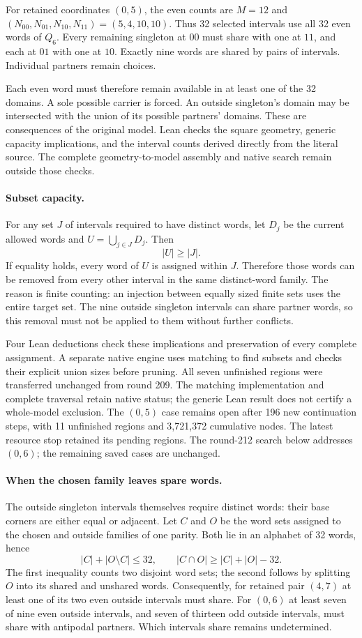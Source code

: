 \documentclass[11pt,a4paper]{article}
\begin{document}
For retained coordinates $(0,5)$, the even counts are
$M=12$ and $(N_{00},N_{01},N_{10},N_{11})=(5,4,10,10)$.
Thus 32 selected intervals use all 32 even words of $Q_6$.
Every remaining singleton at $00$ must share with one at $11$,
and each at $01$ with one at $10$. Exactly nine words are shared by
pairs of intervals. Individual partners remain choices.

Each even word must therefore remain available in at least one of
the 32 domains. A sole possible carrier is forced. An outside
singleton's domain may be intersected with the union of its possible
partners' domains. These are consequences of the original model.
Lean checks the square geometry, generic capacity implications, and
the interval counts derived directly from the literal source.
The complete geometry-to-model assembly and native search remain
outside those checks.

\paragraph{Subset capacity.}
For any set $J$ of intervals required to have distinct words, let $D_j$
be the current allowed words and $U=\bigcup_{j\in J}D_j$. Then
\[
|U|\ge |J|.
\]
If equality holds, every word of $U$ is assigned within $J$. Therefore
those words can be removed from every other interval in the same
distinct-word family. The reason is finite counting: an injection
between equally sized finite sets uses the entire target set.
The nine outside singleton intervals can share partner words, so
this removal must not be applied to them without further conflicts.

Four Lean deductions check these implications and preservation of
every complete assignment. A separate native engine uses matching
to find subsets and checks their explicit union sizes before pruning.
All seven unfinished regions were transferred unchanged from round 209.
The matching implementation and complete traversal retain native status;
the generic Lean result does not certify a whole-model exclusion.
The $(0,5)$ case remains open after 196 new continuation steps,
with 11 unfinished regions and 3,721,372 cumulative nodes. The latest
resource stop retained its pending regions. The round-212 search below addresses $(0,6)$; the remaining saved
cases are unchanged.

\paragraph{When the chosen family leaves spare words.}
The outside singleton intervals themselves require distinct words:
their base corners are either equal or adjacent. Let $C$ and $O$
be the word sets assigned to the chosen and outside families of one
parity. Both lie in an alphabet of 32 words, hence
\[
|C|+|O\setminus C|\le32,\qquad
|C\cap O|\ge |C|+|O|-32.
\]
The first inequality counts two disjoint word sets; the second follows
by splitting $O$ into its shared and unshared words. Consequently,
for retained pair $(4,7)$ at least one of its two even outside intervals
must share. For $(0,6)$ at least seven of nine even outside intervals,
and seven of thirteen odd outside intervals, must share with antipodal
partners. Which intervals share remains undetermined.
\end{document}
